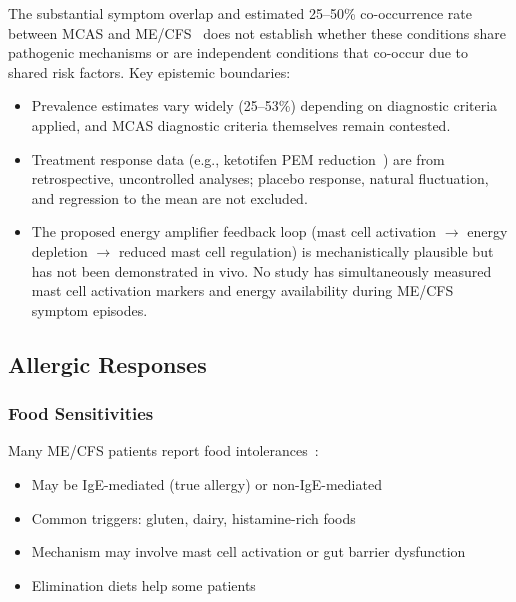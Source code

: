 \begin{limitation}
The substantial symptom overlap and estimated 25--50\% co-occurrence rate between MCAS and ME/CFS~\cite{Wirth2023,Frioni2025MCAS} does not establish whether these conditions share pathogenic mechanisms or are independent conditions that co-occur due to shared risk factors. Key epistemic boundaries:
\begin{itemize}
    \item Prevalence estimates vary widely (25--53\%) depending on diagnostic criteria applied, and MCAS diagnostic criteria themselves remain contested.
    \item Treatment response data (e.g., ketotifen PEM reduction~\cite{Weinstock2024Ketotifen}) are from retrospective, uncontrolled analyses; placebo response, natural fluctuation, and regression to the mean are not excluded.
    \item The proposed energy amplifier feedback loop (mast cell activation $\to$ energy depletion $\to$ reduced mast cell regulation) is mechanistically plausible but has not been demonstrated in vivo. No study has simultaneously measured mast cell activation markers and energy availability during ME/CFS symptom episodes.
\end{itemize}
\end{limitation}

\subsection{Allergic Responses}
\label{sec:allergic-responses}

\subsubsection{Food Sensitivities}

Many ME/CFS patients report food intolerances~\cite{Wirth2023}:
\begin{itemize}
    \item May be IgE-mediated (true allergy) or non-IgE-mediated
    \item Common triggers: gluten, dairy, histamine-rich foods
    \item Mechanism may involve mast cell activation or gut barrier dysfunction~\cite{Hsu2025gut}
    \item Elimination diets help some patients
\end{itemize}

